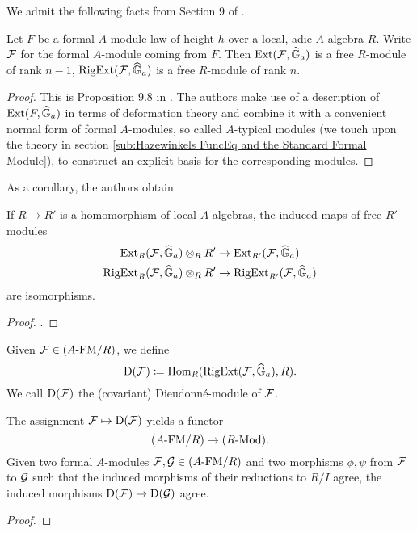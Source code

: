 \documentclass[../main.tex]{subfiles}
\begin{document}
We admit the following facts from Section 9 of \cite{hopkins1994equivariant}.
\begin{prop}\label{prop:InterestingSequenceStdMod}
  Let $F$ be a formal $A$-module law of height $h$ over a local, adic
  $A$-algebra $R$. Write $\mathcal{F}$ for the formal $A$-module coming from 
  $F$. Then $\operatorname{Ext}(\mathcal{F}, \widehat{\mathbb{G}}_a)$ is a free $R$-module of rank $n-1$, 
  $\operatorname {RigExt}(\mathcal{F}, \widehat{\mathbb{G}}_a)$ is a free $R$-module of rank $n$. 
\begin{proof}
  This is Proposition 9.8 in \cite{hopkins1994equivariant}. The authors make
  use of a description of $\operatorname{Ext}(F, \widehat{\mathbb{G}}_a)$ in terms of deformation theory
  and combine it with a convenient normal form of formal $A$-modules, so called
  $A$-typical modules (we touch upon the theory in section \ref{sub:Hazewinkels
  FuncEq and the Standard Formal Module}), to construct an explicit 
  basis for the corresponding modules. 
\end{proof}
\end{prop}
As a corollary, the authors obtain
\begin{lem}
  If $R \to R'$ is a homomorphism of local $A$-algebras, the induced maps 
  of free $R'$-modules
  \begin{gather*}
    \operatorname{Ext}_R(\mathcal{F}, \widehat{\mathbb{G}}_a) \otimes_R R' \to \operatorname{Ext}_{R'}(\mathcal{F}, \widehat{\mathbb{G}}_a) \\
    \operatorname {RigExt}_R(\mathcal{F}, \widehat{\mathbb{G}}_a) \otimes_R R' \to \operatorname {RigExt}_{R'}(\mathcal{F}, \widehat{\mathbb{G}}_a)
  \end{gather*}
  are isomorphisms.
\begin{proof}
  \cite[Corollary 9.13]{hopkins1994equivariant}.
\end{proof}
\end{lem}

\begin{defi}\label{def:DioModule}
  Given $\mathcal{F} \in {({A}\text-\allowbreak\mathrm{FM}/{R})}$, we define 
  $$\mathrm{D}(\mathcal{F}) \coloneqq \operatorname{Hom}_R(\operatorname {RigExt}(\mathcal{F}, \widehat{\mathbb{G}}_a), R).$$ 
  We call $\mathrm{D}(\mathcal{F})$ the (covariant) Dieudonn\'e-module of $\mathcal{F}$. 
\end{defi}

\begin{prop}\label{prop:DioCrystalline}
  The assignment $\mathcal{F} \mapsto \mathrm{D}(\mathcal{F})$ yields a functor
  \begin{equation*}
    {({A}\text-\allowbreak\mathrm{FM}/{R})} \to {({R}\text-\allowbreak\mathrm{Mod})}.
  \end{equation*}
  Given two formal $A$-modules $\mathcal{F}, \mathcal{G} \in {({A}\text-\allowbreak\mathrm{FM}/{R})}$ and two morphisms
  $\phi, \psi$ from $\mathcal{F}$ to $\mathcal{G}$ such that the induced morphisms of their reductions
  to $R/I$ agree, the induced morphisms $\mathrm{D}(\mathcal{F}) \to \mathrm{D}(\mathcal{G})$ agree.
  \begin{proof}
    \todo{!!!} 
  \end{proof}
\end{prop}
\end{document}
